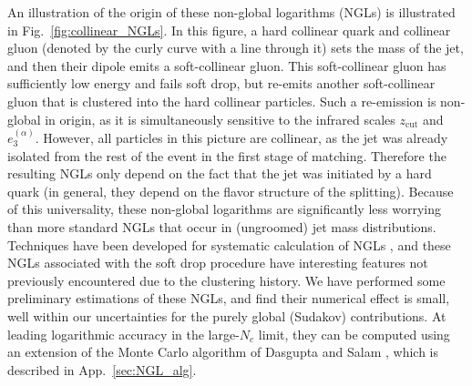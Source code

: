 \documentclass[a4paper,11pt]{article}
\newcommand{\ecf}[2]{e_{#1}^{(#2)}}
\def\zcut{z_{\text{cut}}}
\DeclareRobustCommand{\App}[1]{App.~\ref{#1}}
\DeclareRobustCommand{\Fig}[1]{Fig.~\ref{#1}}
\begin{document}
An illustration of the origin of these non-global logarithms (NGLs) is illustrated in \Fig{fig:collinear_NGLs}.  In this figure, a hard collinear quark and collinear gluon (denoted by the curly curve with a line through it) sets the mass of the jet, and then their dipole emits a soft-collinear gluon.  This soft-collinear gluon has sufficiently low energy and fails soft drop, but re-emits another soft-collinear gluon that is clustered into the hard collinear particles.  Such a re-emission is non-global in origin, as it is simultaneously sensitive to the infrared scales $\zcut$ and $\ecf{3}{\alpha}$.  However, all particles in this picture are collinear, as the jet was already isolated from the rest of the event in the first stage of matching. Therefore the resulting NGLs only depend on the fact that the jet was initiated by a hard quark (in general, they depend on the flavor structure of the splitting).  Because of this universality, these non-global logarithms are significantly less worrying than more standard NGLs that occur in (ungroomed) jet mass distributions. Techniques have been developed for systematic calculation of NGLs \cite{Caron-Huot:2015bja,Larkoski:2015zka,Neill:2015nya,Becher:2015hka,Becher:2016mmh,Larkoski:2016zzc,Neill:2016stq,Becher:2016omr,Becher:2017nof}, and these NGLs associated with the soft drop procedure have interesting features not previously encountered due to the clustering history.  We have performed some preliminary estimations of these NGLs, and find their numerical effect is small, well within our uncertainties for the purely global (Sudakov) contributions. At leading logarithmic accuracy in the large-$N_c$ limit, they can be computed using an extension of the Monte Carlo algorithm of Dasgupta and Salam \cite{Dasgupta:2001sh}, which is described in \App{sec:NGL_alg}. 
\end{document}

